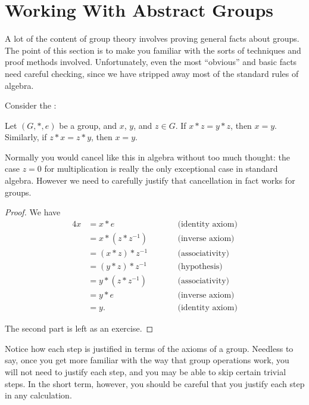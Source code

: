\section{Working With Abstract Groups}

A lot of the content of group theory involves proving general facts about
groups.  The point of this section is to make you familiar with the sorts of
techniques and proof methods involved.  Unfortunately, even the most ``obvious''
and basic facts need careful checking, since we have stripped away most of the
standard rules of algebra.

Consider the :

\begin{proposition}\label{prop:cancellation}
  Let $(G, \ast, e)$ be a group, and $x$, $y$, and $z \in G$.  If
  $x \ast z = y \ast z$, then $x = y$.  Similarly, if $z \ast x = 
  z \ast y$, then $x = y$.
\end{proposition}

Normally you would cancel like this in algebra without too much thought: the
case $z = 0$ for multiplication is really the only exceptional case in
standard algebra.  However we need to carefully justify that cancellation in
fact works for groups.

\begin{proof}
  We have
  \begin{alignat*}{4}
    x &= x \ast e &\qquad &\text{(identity axiom)} \\
      &= x \ast (z \ast z^{-1}) &&\text{(inverse axiom)} \\
      &= (x \ast z) \ast z^{-1} &&\text{(associativity)} \\
      &= (y \ast z) \ast z^{-1} &&\text{(hypothesis)} \\
      &= y \ast (z \ast z^{-1}) &&\text{(associativity)} \\
      &= y \ast e &&\text{(inverse axiom)} \\
      &= y. &&\text{(identity axiom)}
  \end{alignat*}
  
  The second part is left as an exercise.
\end{proof}

Notice how each step is justified in terms of the axioms of a group. 
Needless to say, once you get more familiar with the way that group
operations work, you will not need to justify each step, and you may
be able to skip certain trivial steps.  In the short term, however,
you should be careful that you justify each step in any calculation.


